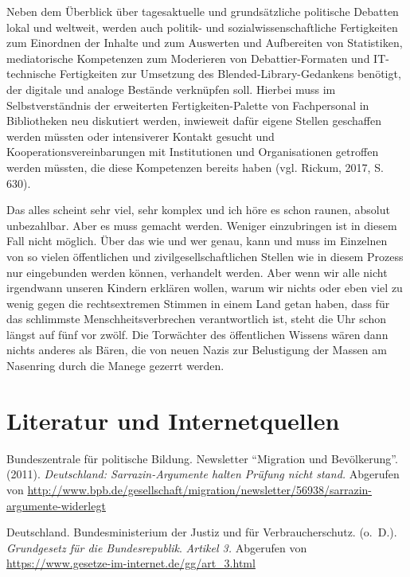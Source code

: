 \documentclass[a4paper,
fontsize=11pt,
oneside,
numbers=noperiodatend,
parskip=half-,
bibliography=totoc,
final
]{scrartcl}
\begin{document}
Neben dem Überblick über tagesaktuelle und grundsätzliche politische
Debatten lokal und weltweit, werden auch politik- und
sozialwissenschaftliche Fertigkeiten zum Einordnen der Inhalte und zum
Auswerten und Aufbereiten von Statistiken, mediatorische Kompetenzen zum
Moderieren von Debattier-Formaten und IT-technische Fertigkeiten zur
Umsetzung des Blended-Library-Gedankens benötigt, der digitale und
analoge Bestände verknüpfen soll. Hierbei muss im Selbstverständnis der
erweiterten Fertigkeiten-Palette von Fachpersonal in Bibliotheken neu
diskutiert werden, inwieweit dafür eigene Stellen geschaffen werden
müssten oder intensiverer Kontakt gesucht und Kooperationsvereinbarungen
mit Institutionen und Organisationen getroffen werden müssten, die diese
Kompetenzen bereits haben (vgl. Rickum, 2017, S. 630).

Das alles scheint sehr viel, sehr komplex und ich höre es schon raunen,
absolut unbezahlbar. Aber es muss gemacht werden. Weniger einzubringen
ist in diesem Fall nicht möglich. Über das wie und wer genau, kann und
muss im Einzelnen von so vielen öffentlichen und zivilgesellschaftlichen
Stellen wie in diesem Prozess nur eingebunden werden können, verhandelt
werden. Aber wenn wir alle nicht irgendwann unseren Kindern erklären
wollen, warum wir nichts oder eben viel zu wenig gegen die
rechtsextremen Stimmen in einem Land getan haben, dass für das
schlimmste Menschheitsverbrechen verantwortlich ist, steht die Uhr schon
längst auf fünf vor zwölf. Die Torwächter des öffentlichen Wissens wären
dann nichts anderes als Bären, die von neuen Nazis zur Belustigung der
Massen am Nasenring durch die Manege gezerrt werden.

\hypertarget{literatur-und-internetquellen}{%
\section*{Literatur und
Internetquellen}\label{literatur-und-internetquellen}}

Bundeszentrale für politische Bildung. Newsletter \enquote{Migration und
Bevölkerung}. (2011). \emph{Deutschland: Sarrazin-Argumente halten
Prüfung nicht stand.} Abgerufen von
\url{http://www.bpb.de/gesellschaft/migration/newsletter/56938/sarrazin-argumente-widerlegt}

Deutschland. Bundesministerium der Justiz und für Verbraucherschutz.
(o.~D.). \emph{Grundgesetz für die Bundesrepublik}. \emph{Artikel 3.}
Abgerufen von \url{https://www.gesetze-im-internet.de/gg/art_3.html}
\end{document}
